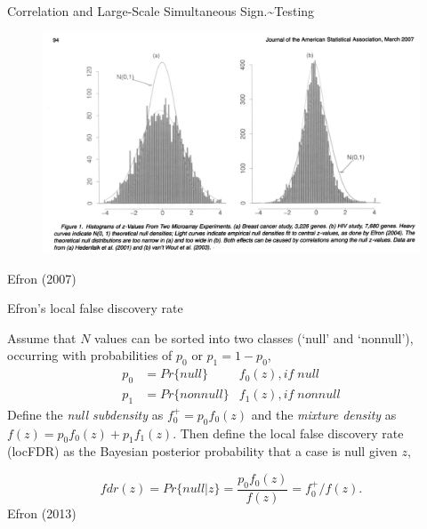 \documentclass[ignorenonframetext,aspectratio=169,]{beamer}
\begin{document}
\begin{frame}{%
\protect\hypertarget{correlation-and-large-scale-simultaneous-sign.testing}{%
Correlation and Large-Scale Simultaneous Sign.\textasciitilde{}Testing}}

\begin{figure}[htb]
  \centering
\includegraphics[keepaspectratio,width=\textwidth,height=0.75\textheight]{../n1pas/figures/Efron2007_figure1.png}
   \end{figure}

Efron (2007)

\end{frame}

\begin{frame}{%
\protect\hypertarget{efrons-local-false-discovery-rate}{%
Efron’s local false discovery rate}}

Assume that \(N\) values can be sorted into two classes (‘null’ and
‘nonnull’), occurring with probabilities of \(p_{0}\) or
\(p_{1}=1-p_{0}\), \begin{align*}
     p_{0} & = Pr\{null\} & f_{0}(z), if \; null \\
     p_{1} & = Pr\{nonnull\} & f_{1}(z), if \; nonnull
   \end{align*} Define the \emph{null subdensity} as
\(f^{+}_{0}=p_{0}f_{0}(z)\) and the \emph{mixture density} as
\(f(z)=p_{0}f_{0}(z) + p_{1}f_{1}(z)\). Then define the local false
discovery rate (locFDR) as the Bayesian posterior probability that a
case is null given \(z\),

\begin{equation*}
fdr(z) = Pr\{null | z \} = \frac{p_{0}f_{0}(z)}{f(z)}= f^{+}_{0}/f(z).
     \end{equation*} Efron (2013)

\end{frame}
\end{document}
